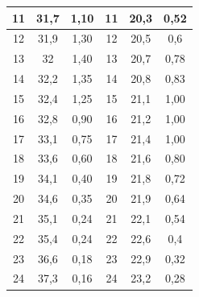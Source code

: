 \documentclass[a4paper, 12pt]{article}%
\begin{document}
\begin{center}
\begin{tabular}{ccc|c|c|c|}
\multicolumn{1}{|c|}{11}  & \multicolumn{1}{c|}{31,7}  & \multicolumn{1}{c|}{1,10}                & 11  & 20,3             & 0,52         \\ \hline
\multicolumn{1}{|c|}{12}  & \multicolumn{1}{c|}{31,9}   & \multicolumn{1}{c|}{1,30}        & 12  & 20,5          & 0,6      \\ \hline
\multicolumn{1}{|c|}{13}  & \multicolumn{1}{c|}{32}         & \multicolumn{1}{c|}{1,40}           & 13  & 20,7           & 0,78      \\ \hline
\multicolumn{1}{|c|}{14}  & \multicolumn{1}{c|}{32,2}    & \multicolumn{1}{c|}{1,35}                  & 14  & 20,8            & 0,83         \\ \hline
\multicolumn{1}{|c|}{15}  & \multicolumn{1}{c|}{32,4}           & \multicolumn{1}{c|}{1,25}     & 15  & 21,1           & 1,00         \\ \hline
\multicolumn{1}{|c|}{16}  & \multicolumn{1}{c|}{32,8}   & \multicolumn{1}{c|}{0,90}               & 16  & 21,2              & 1,00           \\ \hline
\multicolumn{1}{|c|}{17}  & \multicolumn{1}{c|}{33,1}         & \multicolumn{1}{c|}{0,75}                  & 17  & 21,4               & 1,00         \\ \hline
\multicolumn{1}{|c|}{18}  & \multicolumn{1}{c|}{33,6}                 & \multicolumn{1}{c|}{0,60}                  & 18  & 21,6            & 0,80      \\ \hline
\multicolumn{1}{|c|}{19}  & \multicolumn{1}{c|}{34,1}      & \multicolumn{1}{c|}{0,40}                  & 19  & 21,8               & 0,72         \\ \hline
\multicolumn{1}{|c|}{20}  & \multicolumn{1}{c|}{34,6}          & \multicolumn{1}{c|}{0,35}      & 20  & 21,9           & 0,64         \\ \hline
\multicolumn{1}{|c|}{21}  & \multicolumn{1}{c|}{35,1}           & \multicolumn{1}{c|}{0,24}              & 21  & 22,1           & 0,54         \\ \hline
\multicolumn{1}{|c|}{22}  & \multicolumn{1}{c|}{35,4}          & \multicolumn{1}{c|}{0,24}             & 22  & 22,6              & 0,4          \\ \hline
\multicolumn{1}{|c|}{23}  & \multicolumn{1}{c|}{36,6}              & \multicolumn{1}{c|}{0,18}                   & 23  & 22,9        & 0,32          \\ \hline
\multicolumn{1}{|c|}{24}  & \multicolumn{1}{c|}{37,3}           & \multicolumn{1}{c|}{0,16}       & 24  & 23,2     & 0,28 \\ \hline

\end{tabular}
\end{center}
\end{document}
